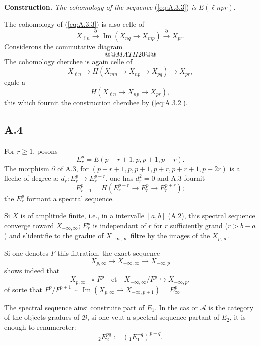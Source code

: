 \documentclass[11pt,a4paper]{article}
\theoremstyle{plain}
\theoremstyle{definition}
\newcommand{\cA}{\mathscr{A}}
\newcommand{\cB}{\mathscr{B}}
\begin{document}
\textbf{Construction.} \emph{The cohomology of the sequence} (\ref{eq:A.3.3}) \emph{is} $E(\ell npr)$.

The cohomology of (\ref{eq:A.3.3}) is also celle of
\[
X_{\ell n} \xrightarrow{\partial} \operatorname{Im}(X_{nq} \to X_{mp}) \xrightarrow{\partial} X_{pr}.
\]
Considerons the commutative diagram
\[
@@MATH20@@
\]
The cohomology cherchee is again celle of
\[
X_{\ell n} \to H(X_{mn} \to X_{np} \to X_{pq}) \to X_{pr},
\]
egale a
\[
H(X_{\ell n} \to X_{np} \to X_{pr}),
\]
this which fournit the construction cherchee by (\ref{eq:A.3.2}).

\subsection*{A.4}
For $r \geqslant 1$, posons
\[
E_r^p = E(p-r+1, p, p+1, p+r).
\]
The morphism $\partial$ of A.3, for $(p-r+1, p, p+1, p+r, p+r+1, p+2r)$ is a fleche of degree a: $d_r \colon E_r^p \to E_r^{p+r}$. one has $d_r^2 = 0$ and A.3 fournit
\[
E_{r+1}^p = H(E_r^{p-r} \to E_r^p \to E_r^{p+r});
\]
the $E_r^p$ formant a spectral sequence.

Si $X$ is of amplitude finite, i.e., in a intervalle $[a,b]$ (A.2), this spectral sequence converge toward $X_{-\infty,\infty}$; $E_r^p$ is independant of $r$ for $r$ sufficiently grand ($r > b-a$) and s'identifie to the gradue of $X_{-\infty,\infty}$ filtre by the images of the $X_{p,\infty}$.

Si one denotes $F$ this filtration, the exact sequence
\[
X_{p,\infty} \to X_{-\infty,\infty} \to X_{-\infty,p}
\]
shows indeed that
\[
X_{p,\infty} \twoheadrightarrow F^p \quad \text{et} \quad X_{-\infty,\infty}/F^p \hookrightarrow X_{-\infty,p},
\]
of sorte that $F^p/F^{p+1} \sim \operatorname{Im}(X_{p,\infty} \to X_{-\infty,p+1}) = E_\infty^p$.

The spectral sequence ainsi construite part of $E_1$. In the cas or $\cA$ is the category of the objects gradues of $\cB$, si one veut a spectral sequence partant of $E_2$, it is enough to renumeroter:
\[
{}_2\!E_2^{pq} := ({}_1\!E_1^{-q})^{p+q}.
\]
\end{document}
